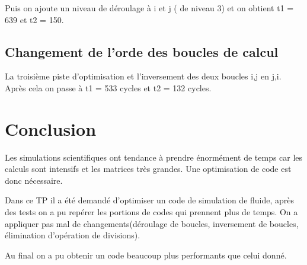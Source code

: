 \documentclass[a4paper, 10pt]{article}
\begin{document}
Puis on ajoute un niveau de d\'eroulage \`a i et j ( de niveau 3) et on obtient t1 = 639 et t2 = 150.\\


\subsection{Changement de l'orde des boucles de calcul}
La troisi\`eme piste d'optimisation et l'inversement des deux boucles i,j en j,i. \\
Apr\`es cela on passe \`a t1 = 533 cycles et t2 = 132 cycles. 


\section{Conclusion}
Les simulations scientifiques ont tendance \`a prendre \'enorm\'ement de temps car les calculs sont intensifs et les matrices tr\`es grandes. Une optimisation de code est donc n\'ecessaire.

Dans ce TP il a \'et\'e demand\'e d'optimiser un code de simulation de fluide, apr\`es des tests on a pu rep\'erer les portions de codes qui prennent plus de temps. On a appliquer pas mal de changements(d\'eroulage de boucles, inversement de boucles, \'elimination d'op\'eration de divisions).

Au final on a pu obtenir un code beaucoup plus performants que celui donn\'e.
 
      
\end{document}
